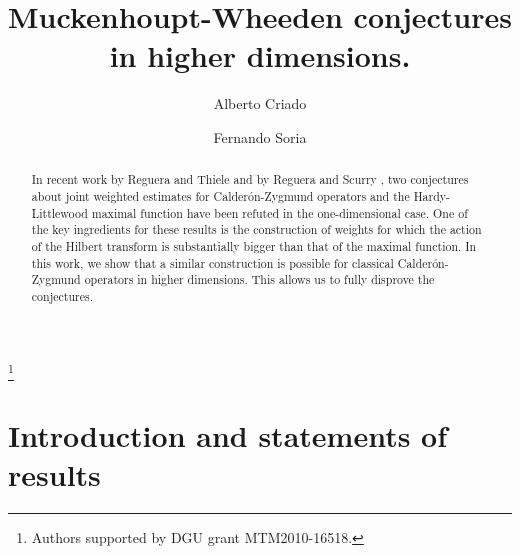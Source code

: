 \documentclass[11pt]{amsart}
\theoremstyle{definition}
\begin{document}
\title[Muckenhoupt-Wheeden conjectures in higher dimensions.]{Muckenhoupt-Wheeden conjectures in higher dimensions.}

\author[A. Criado]{Alberto Criado}
\address{Alberto Criado \newline\indent Departamento de Matem\'aticas, Universidad Aut\'onoma de Madrid, 28049 Madrid, Spain}
\thanks{Authors supported by DGU grant MTM2010-16518.}

\author[F. Soria]{Fernando Soria}
\address{Fernando Soria \newline\indent Departamento de Matem\'aticas and Instituto de Ciencias Matem\'aticas CSIC--UAM--UC3M--UCM, Universidad Aut\'onoma de Madrid, 28049 Madrid, Spain}

\begin{abstract}

In recent work by Reguera and Thiele \cite{RegueraThiele} and by Reguera and Scurry \cite{RegueraScurry}, two conjectures about joint weighted estimates for  Calder\'on-Zygmund operators and the Hardy-Littlewood maximal function have been refuted in the one-dimensional case. One of the key ingredients for these results is the construction of weights for which the action of the Hilbert transform is substantially bigger than that of the maximal function. In this work, we show that a similar construction is possible for classical Calder\'on-Zygmund operators in higher dimensions. This allows us to fully disprove the conjectures.

\end{abstract}


\maketitle

\section{Introduction and statements of results}
\end{document}

